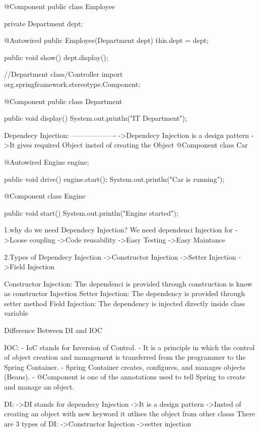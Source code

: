 		@Component
		public class Employee {


			private Department dept;


			@Autowired
			public Employee(Department dept) {
				this.dept = dept;
			}


			public void show() {
				dept.display();
			}
		}
		
	//Department class/Controller
	import org.springframework.stereotype.Component;


		@Component
		public class Department {


			public void display() {
				System.out.println("IT Department");
			}
		}
		
		
	Dependecy Injection:
	-------------------
			->Dependecy Injection is a design pattern 
			->It gives required Object insted of creating the Object
			@Component
			class Car {


				@Autowired
				Engine engine;


				public void drive() {
					engine.start();
					System.out.println("Car is running");
				}
			}
			
			@Component
			class Engine {


				public void start() {
					System.out.println("Engine started");
				}
			}
			
			1.why do we need Dependecy Injection?
			We need dependenci Injection for	
				->Loose coupling
				->Code reusability
				->Easy Testing
				->Easy Maintance
				
			2.Types of Dependecy Injection
				->Constructor Injection
				->Setter Injection
				->Field Injection
				
			Constructor Injection:
				The dependenci is provided through construction is know as constructor Injection
			Setter Injection:
				The dependency is provided through setter method
			Field Injection:
				The dependency is injected directly inside class variable
				
			Difference Between DI  and IOC 
			
			IOC:
			- IoC stands for Inversion of Control.
			- It is a principle in which the control of object creation and management is transferred from the programmer to the Spring Container.
			- Spring Container creates, configures, and manages objects (Beans).
			- @Component is one of the annotations used to tell Spring to create and manage an object.
				
			DI:
			->DI stands for dependecy Injection
			->It is a design pattern
			->Insted of creating an object with new keyword it utlises the object from other classs
			There are 3 types of DI:
				->Constructor Injection
				->setter injection




